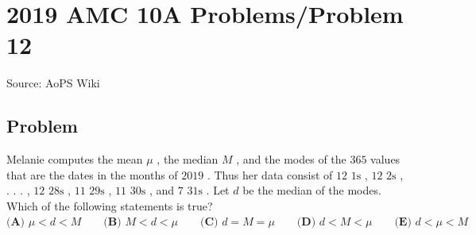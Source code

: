 \documentclass[12pt]{article}
\begin{document}
\section*{{2019 AMC 10A Problems/Problem 12}}
Source: AoPS Wiki

\subsection*{Problem}
Melanie computes the mean $\mu$ , the median $M$ , and the modes of the $365$ values that are the dates in the months of $2019$ . Thus her data consist of $12$ $1\text{s}$ , $12$ $2\text{s}$ , . . . , $12$ $28\text{s}$ , $11$ $29\text{s}$ , $11$ $30\text{s}$ , and $7$ $31\text{s}$ . Let $d$ be the median of the modes. Which of the following statements is true? $\textbf{(A) } \mu < d < M \qquad\textbf{(B) } M < d < \mu \qquad\textbf{(C) } d = M =\mu \qquad\textbf{(D) } d < M < \mu \qquad\textbf{(E) } d < \mu < M$
\end{document}
